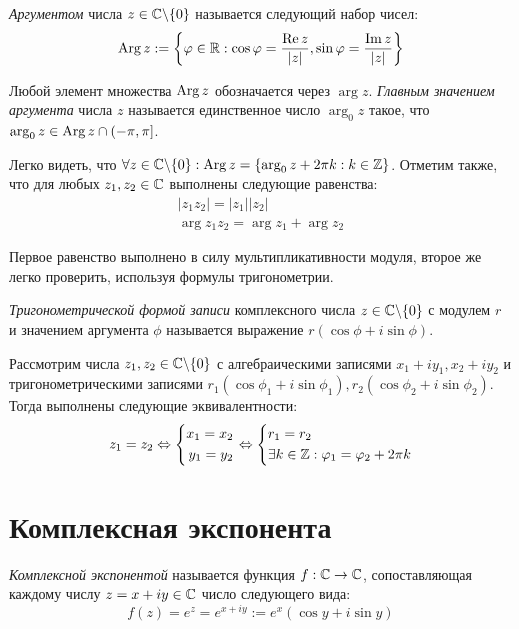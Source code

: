 \begin{definition}
	\textit{Аргументом} числа $z \in \mathbb{C} \backslash \{0\}$ называется следующий набор чисел:
	\[\operatorname{Arg}{z} := \left\{\varphi \in \mathbb{R}: \cos\varphi = \frac{\operatorname{Re} z}{|z|}, \sin\varphi = \frac{\operatorname{Im} z}{|z|}\right\}\]
	
	Любой элемент множества $\operatorname{Arg}{z}$ обозначается через $\arg{z}$. \textit{Главным значением аргумента} числа $z$ называется единственное число $\arg_0{z}$ такое, что $\arg_0{z} \in \operatorname{Arg}{z} \cap (-\pi, \pi]$.
\end{definition}

\begin{note}
	Легко видеть, что $\forall z \in \mathbb{C} \backslash \{0\}: \operatorname{Arg}{z} = \{\arg_0{z} + 2\pi k: k \in \mathbb{Z}\}$. Отметим также, что для любых $z_1, z_2 \in \mathbb{C}$ выполнены следующие равенства:
	\begin{align*}
		|z_1z_2| = |z_1||z_2|\\
		\arg{z_1z_2} = \arg{z_1} + \arg{z_2}
	\end{align*}
	
	Первое равенство выполнено в силу мультипликативности модуля, второе же легко проверить, используя формулы тригонометрии.
\end{note}

\begin{definition}
	\textit{Тригонометрической формой записи} комплексного числа $z \in \mathbb{C} \backslash \{0\}$ с модулем $r$ и значением аргумента $\phi$ называется выражение $r(\cos\phi + i\sin\phi)$.
\end{definition}

\begin{note}
	Рассмотрим числа $z_1, z_2 \in \mathbb{C} \backslash \{0\}$ с алгебраическими записями $x_1 + iy_1, x_2 + iy_2$ и тригонометрическими записями $r_1(\cos\phi_1 + i\sin\phi_1), r_2(\cos\phi_2 + i\sin\phi_2)$. Тогда выполнены следующие эквивалентности:
	\[z_1 = z_2 \Leftrightarrow \left\{\begin{aligned}x_1 = x_2 \\ y_1 = y_2\end{aligned}\right. \Leftrightarrow \left\{\begin{aligned}&r_1 = r_2 \\ &\exists k \in \mathbb{Z}: \varphi_1 = \varphi_2 + 2\pi k\end{aligned}\right.\]
\end{note}

\section{Комплексная экспонента}

\begin{definition}
	\textit{Комплексной экспонентой} называется функция $f : \mathbb{C} \to \mathbb{C}$, сопоставляющая каждому числу $z = x + iy \in \mathbb{C}$ число следующего вида:
	\[f(z) = e^z = e^{x + iy} := e^x(\cos{y} + i\sin{y})\]
\end{definition}

